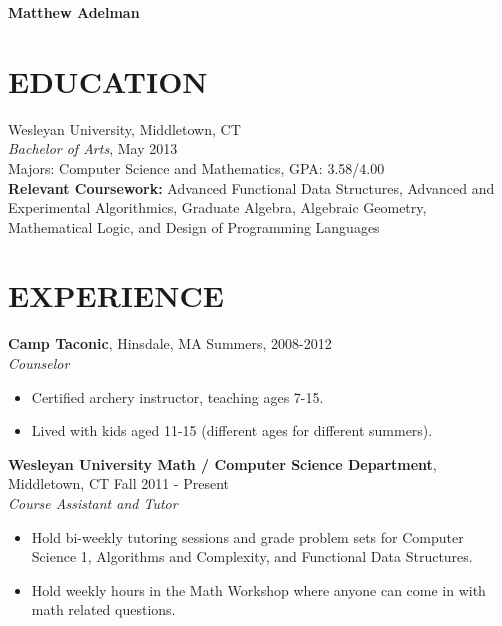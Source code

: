 \documentclass[11pt]{res} %
\begin{document}
 

{\bf\Large Matthew Adelman}

\address{45 Wyllys Avenue $\bullet$ Wesbox \#91531 
        $\bullet$  Middletown, CT 06459   \\ (201) 323-2719 
        \\madelman@wesleyan.edu}

\address{}

\begin{resume}

\section{EDUCATION}
 \noindent Wesleyan University, Middletown, CT \\
{\it Bachelor of Arts}, May 2013 \\
Majors: Computer Science and Mathematics, GPA: 3.58/4.00 \\
{\bf Relevant Coursework:} Advanced Functional Data Structures, Advanced and 
Experimental Algorithmics, Graduate Algebra, Algebraic Geometry, Mathematical
Logic, and Design of Programming Languages

\section{EXPERIENCE}
{\bf Camp Taconic}, Hinsdale, MA \hfill Summers, 2008-2012 \\
{\it Counselor} 
\vspace{0.01in} %
   \begin{itemize} \itemsep -2pt  %
   \item Certified archery instructor, teaching ages 7-15.
   \item Lived with kids aged 11-15 (different ages for different summers). 
   \end{itemize}

\vspace{-0.05in} %

{\bf Wesleyan University Math / Computer Science Department}, Middletown, CT 
\hfill Fall 2011 - Present\\ 
{\it Course Assistant and Tutor} \\
\vspace{-0.17in}
 \begin{itemize} \itemsep -2pt
   \item Hold bi-weekly tutoring sessions and grade problem sets for Computer
   Science 1, Algorithms and Complexity, and Functional Data Structures.  
   \item Hold weekly hours in the Math Workshop where anyone can come in with
   math related questions.  
   \end{itemize} 


\end{resume}
\end{document}
